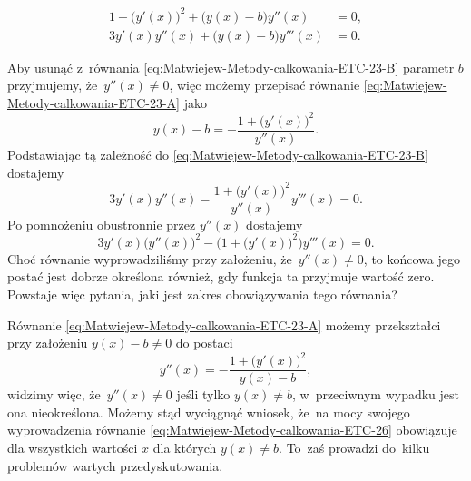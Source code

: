 \documentclass[a4paper,11pt]{article}
\numberwithin{equation}{section}
\begin{document}
\negVerSpaceFour


\begin{subequations}

  \begin{align}
    \label{eq:Matwiejew-Metody-calkowania-ETC-23-A}
    1 + \big( y'( x ) \big)^{ 2 } + \big( y( x ) - b \big) y''( x )
    &= 0, \\
    \label{eq:Matwiejew-Metody-calkowania-ETC-23-B}
    3 y'( x ) y''( x ) + \big( y( x ) - b \big) y'''( x )
    &= 0.
  \end{align}

\end{subequations}


\noindent
Aby usunąć z~równania \eqref{eq:Matwiejew-Metody-calkowania-ETC-23-B}
parametr $b$ przyjmujemy, że~$y''( x ) \neq 0$, więc możemy przepisać równanie
\eqref{eq:Matwiejew-Metody-calkowania-ETC-23-A} jako
\begin{equation}
  \label{eq:Matwiejew-Metody-calkowania-ETC-24}
  y( x ) - b =
  -\frac{ 1 + \big( y'( x ) \big)^{ 2 } }{ y''( x ) }.
\end{equation}
Podstawiając tą zależność do \eqref{eq:Matwiejew-Metody-calkowania-ETC-23-B}
dostajemy
\begin{equation}
  \label{eq:Matwiejew-Metody-calkowania-ETC-25}
  3 y'( x ) y''( x ) -
  \frac{ 1 + \big( y'( x ) \big)^{ 2 } }{ y''( x ) } y'''( x ) = 0.
\end{equation}
Po pomnożeniu obustronnie przez $y''( x )$ dostajemy
\begin{equation}
  \label{eq:Matwiejew-Metody-calkowania-ETC-26}
  3 y'( x ) \big( y''( x ) \big)^{ 2 } -
  \Big( 1 + \big( y'( x ) \big)^{ 2 } \Big) y'''( x ) = 0.
\end{equation}
Choć równanie wyprowadziliśmy przy założeniu, że~$y''( x ) \neq 0$, to końcowa
jego postać jest dobrze określona również, gdy funkcja ta przyjmuje wartość
zero. Powstaje więc pytania, jaki jest zakres obowiązywania tego równania?

Równanie \eqref{eq:Matwiejew-Metody-calkowania-ETC-23-A} możemy przekształci
przy założeniu $y( x ) - b \neq 0$ do postaci
\begin{equation}
  \label{eq:Matwiejew-Metody-calkowania-ETC-27}
  y''( x ) =
  -\frac{ 1 + \big( y'( x ) \big)^{ 2 } }{ y( x ) - b },
\end{equation}
widzimy więc, że~$y''( x ) \neq 0$ jeśli tylko $y( x ) \neq b$, w~przeciwnym
wypadku jest ona nieokreślona. Możemy stąd wyciągnąć wniosek,
że~na mocy swojego wyprowadzenia równanie
\eqref{eq:Matwiejew-Metody-calkowania-ETC-26} obowiązuje dla wszystkich
wartości $x$ dla których $y( x ) \neq b$. To~zaś prowadzi do~kilku problemów
wartych przedyskutowania.
\end{document}
